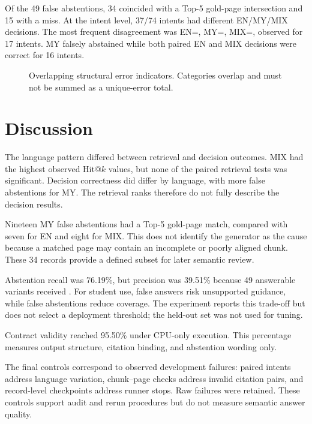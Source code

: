 \documentclass[a4paper,conference]{IEEEtran}
\newcommand{\code}[1]{\texttt{\detokenize{#1}}}
\begin{document}
Of the 49 false abstentions, 34 coincided with a Top-5 gold-page intersection and 15 with a miss. At the intent level, 37/74 intents had different EN/MY/MIX decisions. The most frequent disagreement was EN=\code{ANSWER}, MY=\code{ABSTAIN}, MIX=\code{ANSWER}, observed for 17 intents. MY falsely abstained while both paired EN and MIX decisions were correct for 16 intents.

\begin{figure}[t]
\centering

\caption{Overlapping structural error indicators. Categories overlap and must not be summed as a unique-error total.}
\label{fig:structural-errors}
\end{figure}

\section{Discussion}
The language pattern differed between retrieval and decision outcomes. MIX had the highest observed Hit@$k$ values, but none of the paired retrieval tests was significant. Decision correctness did differ by language, with more false abstentions for MY. The retrieval ranks therefore do not fully describe the decision results.

Nineteen MY false abstentions had a Top-5 gold-page match, compared with seven for EN and eight for MIX. This does not identify the generator as the cause because a matched page may contain an incomplete or poorly aligned chunk. These 34 records provide a defined subset for later semantic review.

Abstention recall was 76.19\%, but precision was 39.51\% because 49 answerable variants received \code{ABSTAIN}. For student use, false answers risk unsupported guidance, while false abstentions reduce coverage. The experiment reports this trade-off but does not select a deployment threshold; the held-out set was not used for tuning.

Contract validity reached 95.50\% under CPU-only execution. This percentage measures output structure, citation binding, and abstention wording only.

The final controls correspond to observed development failures: paired intents address language variation, chunk--page checks address invalid citation pairs, and record-level checkpoints address runner stops. Raw failures were retained. These controls support audit and rerun procedures but do not measure semantic answer quality.
\end{document}
